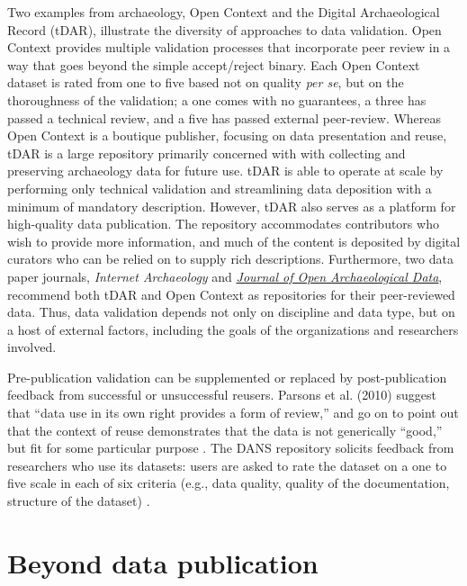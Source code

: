\documentclass[10pt,a4paper,twocolumn]{article}
\begin{document}
{Two examples from archaeology, Open Context and the Digital Archaeological Record (tDAR), illustrate the diversity of approaches to data validation.
Open Context provides multiple validation processes that incorporate peer review in a way that goes beyond the simple accept/reject binary\cite{kansa_we_2013}.
Each Open Context dataset is rated from one to five based not on quality \emph{per se}, but on the thoroughness of the validation; a one comes with no guarantees, a three has passed a technical review, and a five has passed external peer-review.
Whereas Open Context is a boutique publisher, focusing on data presentation and reuse, tDAR is a large repository primarily concerned with with collecting and preserving archaeology data for future use.
tDAR is able to operate at scale by performing only technical validation and streamlining data deposition with a minimum of mandatory description.
However, tDAR also serves as a platform for high-quality data publication.
The repository accommodates contributors who wish to provide more information, and much of the content is deposited by digital curators who can be relied on to supply rich descriptions.
Furthermore, two data paper journals, \emph{Internet Archaeology} and \href{http://openarchaeologydata.metajnl.com/}{\emph{Journal of Open Archaeological Data}}, recommend both tDAR and Open Context as repositories for their peer-reviewed data.
Thus, data validation depends not only on discipline and data type, but on a host of external factors, including the goals of the organizations and researchers involved.

Pre-publication validation can be supplemented or replaced by post-publication feedback from successful or unsuccessful reusers.
Parsons et al. (2010) suggest that ``data use in its own right provides a form of review,'' and go on to point out that the context of reuse demonstrates that the data is not generically ``good,'' but fit for some particular purpose \cite{parsons_data_2010}.
The DANS repository solicits feedback from researchers who use its datasets: users are asked to rate the dataset on a one to five scale in each of six criteria (e.g., data quality, quality of the documentation, structure of the dataset) \cite{grootveld_data_2011,grootveld_peer-reviewed_2012}.


\section*{Beyond data publication}\label{beyond-data-publication}

}
\end{document}
